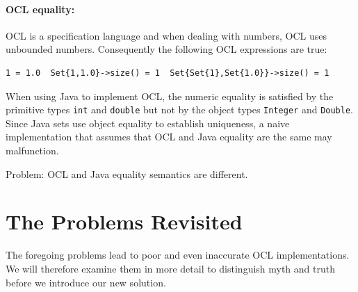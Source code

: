 \documentclass{llncs}
\begin{document}
\paragraph{OCL equality:}

OCL is a specification language and when dealing with numbers, OCL uses unbounded numbers. Consequently the following OCL expressions are true:
\begin{verbatim}
1 = 1.0  Set{1,1.0}->size() = 1  Set{Set{1},Set{1.0}}->size() = 1
\end{verbatim}
When using Java to implement OCL, the numeric equality is satisfied by the primitive types \verb$int$ and \verb$double$ but not by the object types \verb$Integer$ and \verb$Double$. Since Java sets use object equality to establish uniqueness, a naive implementation that assumes that OCL and Java equality are the same may malfunction.

Problem: OCL and Java equality semantics are different.


\section{The Problems Revisited}\label{Problems Revisited}

The foregoing problems lead to poor and even inaccurate OCL implementations. We will therefore examine them in more detail to distinguish myth and truth before we introduce our new solution.


\end{document}
